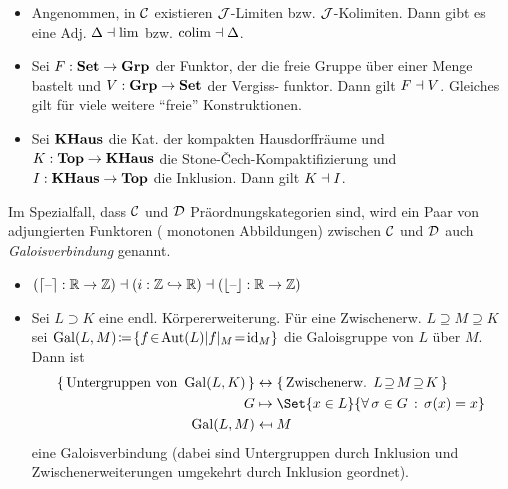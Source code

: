 \documentclass{cheat-sheet}
\DeclareMathOperator{\Gal}{Gal} %
\newcommand{\ceil}[1]{\lceil #1 \rceil} %
\newcommand{\floor}[1]{\lfloor #1 \rfloor} %
\begin{document}
\begin{bspe}
  \begin{itemize}
    \item Angenommen, in $\mathcal{C}$ existieren $\mathcal{J}$-Limiten bzw. $\mathcal{J}$-Kolimiten. Dann gibt es eine Adj.
    $\Delta \dashv \lim$
    bzw.
    $\operatorname{colim} \dashv \Delta$.
    \item Sei $F : \mathbf{Set} \to \mathbf{Grp}$ der Funktor, der die freie Gruppe über einer Menge bastelt und $V : \mathbf{Grp} \to \mathbf{Set}$ der Vergiss- funktor. Dann gilt $F \dashv V$. Gleiches gilt für viele weitere "`freie"' Konstruktionen.
    \item Sei $\mathbf{KHaus}$ die Kat. der kompakten Hausdorffräume und $K : \mathbf{Top} \to \mathbf{KHaus}$ die Stone-Čech-Kompaktifizierung und $I : \mathbf{KHaus} \to \mathbf{Top}$ die Inklusion. Dann gilt $K \dashv I$.
  \end{itemize}
\end{bspe}

\begin{defn}
  Im Spezialfall, dass $\mathcal{C}$ und $\mathcal{D}$ Präordnungskategorien sind, wird ein Paar von adjungierten Funktoren (\dh{} monotonen Abbildungen) zwischen $\mathcal{C}$ und $\mathcal{D}$ auch \emph{Galoisverbindung} genannt.
\end{defn}

\begin{bspe}
  \begin{itemize}
    \item $(\ceil{\blank} : \R \to \Z) \ladj (i : \Z \hookrightarrow \R) \ladj (\floor{\blank} : \R \to \Z)$
    \item Sei $L \supset K$ eine endl. Körpererweiterung.
    Für eine Zwischenerw. $L \!\supseteq\! M \!\supseteq\! K$ sei
    $\Gal(L, M) \!\coloneqq\! \{ f \!\in\! \Aut(L) | f|_M \!=\! \id_M \}$ die Galoisgruppe von $L$ über $M$.
    Dann ist
    \begin{align*}
      \{ \, \text{Untergruppen von } \Gal(L, K) \, \} & \leftrightarrow \{ \, \text{Zwischenerw. } L \!\supseteq\! M \!\supseteq\! K \, \} \\
      G & \mapsto \Set{x \in L}{\fa{\sigma \in G} \sigma(x) = x} \\
      \Gal(L, M) & \mapsfrom M
    \end{align*}
    eine Galoisverbindung (dabei sind Untergruppen durch Inklusion und Zwischenerweiterungen umgekehrt durch Inklusion geordnet).
  \end{itemize}
\end{bspe}
\end{document}
